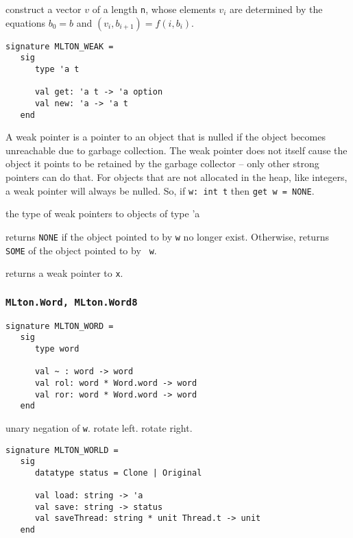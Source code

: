\begin{description}

construct a vector $v$ of a length {\tt n}, whose elements $v_i$ are determined
by the equations $b_0 = b$ and $(v_i, b_{i+1}) = f (i, b_i)$.

\end{description}

\begin{verbatim}
signature MLTON_WEAK =
   sig
      type 'a t

      val get: 'a t -> 'a option
      val new: 'a -> 'a t
   end
\end{verbatim}

A weak pointer is a pointer to an object that is nulled if the
object becomes unreachable due to garbage collection.  The weak
pointer does not itself cause the object it points to be retained by
the garbage collector -- only other strong pointers can do that.
For objects that are not allocated in the heap, like integers, a weak
pointer will always be nulled.  So, if {\tt w: int t} then
{\tt get w = NONE}.

\begin{description}
the type of weak pointers to objects of type 'a

returns {\tt NONE} if the object pointed to by {\tt w} no longer
exist.  Otherwise, returns {\tt SOME} of the object pointed to by {\tt
w}.

returns a weak pointer to {\tt x}.
\end{description}

\subsubsection{\tt MLton.Word, MLton.Word8}
\begin{verbatim}
signature MLTON_WORD =
   sig
      type word
         
      val ~ : word -> word
      val rol: word * Word.word -> word
      val ror: word * Word.word -> word
   end
\end{verbatim}

\begin{description}
unary negation of {\tt w}.
rotate left.
rotate right.
\end{description}

\begin{verbatim}
signature MLTON_WORLD =
   sig
      datatype status = Clone | Original

      val load: string -> 'a
      val save: string -> status
      val saveThread: string * unit Thread.t -> unit
   end
\end{verbatim}

